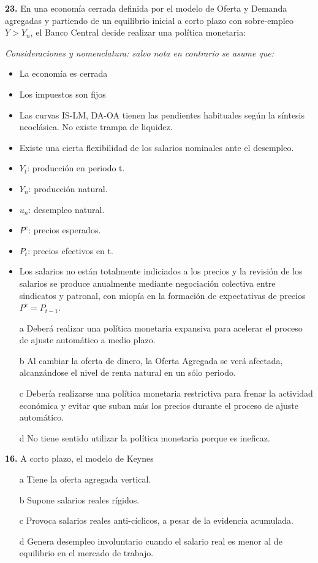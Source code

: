 \documentclass{nuevotema}
\begin{document}
\textbf{23.} En una economía cerrada definida por el modelo de Oferta y Demanda agregadas y partiendo de un equilibrio inicial a corto plazo con sobre-empleo $Y > Y_n$, el Banco Central decide realizar una política monetaria:

\textit{Consideraciones y nomenclatura: salvo nota en contrario se asume que:}

\begin{itemize}
	\item La economía es cerrada
	\item Los impuestos son fijos
	\item Las curvas IS-LM, DA-OA tienen las pendientes habituales según la síntesis neoclásica. No existe trampa de liquidez.
	\item Existe una cierta flexibilidad de los salarios nominales ante el desempleo.
	\item $Y_t$: producción en periodo t.
	\item $Y_n$: producción natural.
	\item $u_n$: desempleo natural.
	\item $P^e$: precios esperados.
	\item $P_t$: precios efectivos en t.
	\item Los salarios no están totalmente indiciados a los precios y la revisión de los salarios se produce anualmente mediante negociación colectiva entre sindicatos y patronal, con miopía en la formación de expectativas de precios $P^e=P_{t-1}$.
\end{itemize}

\begin{enumerate}
	\item[a] Deberá realizar una política monetaria expansiva para acelerar el proceso de ajuste automático a medio plazo.
	\item[b] Al cambiar la oferta de dinero, la Oferta Agregada se verá afectada, alcanzándose el nivel de renta natural en un sólo periodo.
	\item[c] Debería realizarse una política monetaria restrictiva para frenar la actividad económica y evitar que suban más los precios durante el proceso de ajuste automático.
	\item[d] No tiene sentido utilizar la política monetaria porque es ineficaz.
\end{enumerate}

\textbf{16.} A corto plazo, el modelo de Keynes

\begin{enumerate}
	\item[a] Tiene la oferta agregada vertical.
	\item[b] Supone salarios reales rígidos.
	\item[c] Provoca salarios reales anti-cíclicos, a pesar de la evidencia acumulada.
	\item[d] Genera desempleo involuntario cuando el salario real es menor al de equilibrio en el mercado de trabajo.
\end{enumerate}
\end{document}
